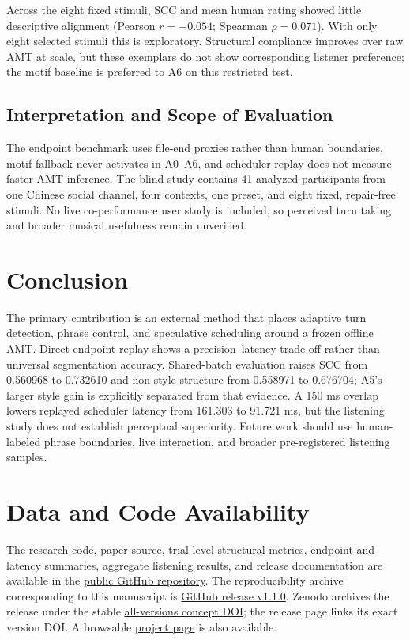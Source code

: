 \documentclass[11pt,a4paper]{article}
\begin{document}
Across the eight fixed stimuli, SCC and mean human rating showed little descriptive alignment (Pearson $r=-0.054$; Spearman $\rho=0.071$). With only eight selected stimuli this is exploratory. Structural compliance improves over raw AMT at scale, but these exemplars do not show corresponding listener preference; the motif baseline is preferred to A6 on this restricted test.

\subsection{Interpretation and Scope of Evaluation}
\label{subsec:subjective-evaluation-scope}

The endpoint benchmark uses file-end proxies rather than human boundaries, motif fallback never activates in A0--A6, and scheduler replay does not measure faster AMT inference. The blind study contains 41 analyzed participants from one Chinese social channel, four contexts, one preset, and eight fixed, repair-free stimuli. No live co-performance user study is included, so perceived turn taking and broader musical usefulness remain unverified.

\section{Conclusion}
\label{sec:conclusion-future-work}

The primary contribution is an external method that places adaptive turn detection, phrase control, and speculative scheduling around a frozen offline AMT. Direct endpoint replay shows a precision--latency trade-off rather than universal segmentation accuracy. Shared-batch evaluation raises SCC from 0.560968 to 0.732610 and non-style structure from 0.558971 to 0.676704; A5's larger style gain is explicitly separated from that evidence. A 150 ms overlap lowers replayed scheduler latency from 161.303 to 91.721 ms, but the listening study does not establish perceptual superiority. Future work should use human-labeled phrase boundaries, live interaction, and broader pre-registered listening samples.

\section*{Data and Code Availability}
\label{sec:data-code-availability}

The research code, paper source, trial-level structural metrics, endpoint and latency summaries, aggregate listening results, and release documentation are available in the \href{https://github.com/MickeyWzt/real-time-midi-call-response}{public GitHub repository}. The reproducibility archive corresponding to this manuscript is \href{https://github.com/MickeyWzt/real-time-midi-call-response/releases/tag/v1.1.0}{GitHub release v1.1.0}. Zenodo archives the release under the stable \href{https://doi.org/10.5281/zenodo.20838083}{all-versions concept DOI}; the release page links its exact version DOI. A browsable \href{https://mickeywzt.github.io/real-time-midi-call-response/}{project page} is also available.
\end{document}
